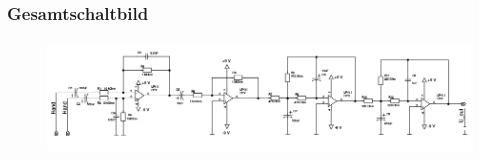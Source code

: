 \begin{frame}
\begin{columns}[c]
\begin{figure}[H]
\begin{center}
    \end{center}
    \end{figure}
    \end{columns}
\end{frame}

\begin{frame}
    \frametitle{Gesamtschaltbild}
    \framesubtitle{}
    \begin{figure}[H]
    \begin{center}
            \includegraphics[scale=0.35]{./img/schaltung/alles_zusammen.png}
    \end{center}
    \end{figure}
\end{frame}
